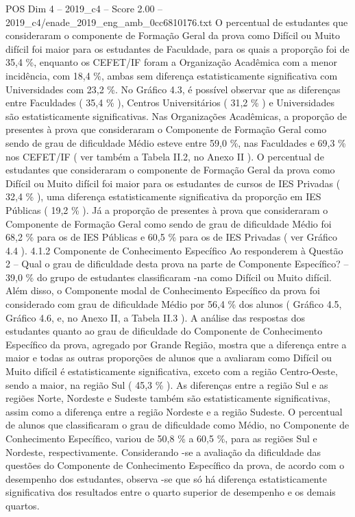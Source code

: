 \begin{textsample}{POS Dim 4 – 2019\_c4 – Score 2.00 – 2019\_c4/enade\_2019\_eng\_amb\_0cc6810176.txt}
O percentual de estudantes que consideraram o componente de Formação Geral da prova como Difícil ou Muito difícil foi maior para os estudantes de Faculdade, para os quais a proporção foi de 35,4 \%, enquanto os CEFET/IF foram a Organização Acadêmica com a menor incidência, com 18,4 \%, ambas sem diferença estatisticamente significativa com Universidades com 23,2 \%.
No Gráfico 4.3, é possível observar que as diferenças entre Faculdades ( 35,4 \% ), Centros Universitários ( 31,2 \% ) e Universidades são estatisticamente significativas.
Nas Organizações Acadêmicas, a proporção de presentes à prova que consideraram o Componente de Formação Geral como sendo de grau de dificuldade Médio esteve entre 59,0 \%, nas Faculdades e 69,3 \% nos CEFET/IF ( ver também a Tabela II.2, no Anexo II ).
O percentual de estudantes que consideraram o componente de Formação Geral da prova como Difícil ou Muito difícil foi maior para os estudantes de cursos de IES Privadas ( 32,4 \% ), uma diferença estatisticamente significativa da proporção em IES Públicas ( 19,2 \% ).
Já a proporção de presentes à prova que consideraram o Componente de Formação Geral como sendo de grau de dificuldade Médio foi 68,2 \% para os de IES Públicas e 60,5 \% para os de IES Privadas ( ver Gráfico 4.4 ). 4.1.2 Componente de Conhecimento Específico Ao responderem à Questão 2 – Qual o grau de dificuldade desta prova na parte de Componente Específico? – 39,0 \% do grupo de estudantes classificaram -na como Difícil ou Muito difícil.
Além disso, o Componente modal de Conhecimento Específico da prova foi considerado com grau de dificuldade Médio por 56,4 \% dos alunos ( Gráfico 4.5, Gráfico 4.6, e, no Anexo II, a Tabela II.3 ).
A análise das respostas dos estudantes quanto ao grau de dificuldade do Componente de Conhecimento Específico da prova, agregado por Grande Região, mostra que a diferença entre a maior e todas as outras proporções de alunos que a avaliaram como Difícil ou Muito difícil é estatisticamente significativa, exceto com a região Centro-Oeste, sendo a maior, na região Sul ( 45,3 \% ).
As diferenças entre a região Sul e as regiões Norte, Nordeste e Sudeste também são estatisticamente significativas, assim como a diferença entre a região Nordeste e a região Sudeste.
O percentual de alunos que classificaram o grau de dificuldade como Médio, no Componente de Conhecimento Específico, variou de 50,8 \% a 60,5 \%, para as regiões Sul e Nordeste, respectivamente.
Considerando -se a avaliação da dificuldade das questões do Componente de Conhecimento Específico da prova, de acordo com o desempenho dos estudantes, observa -se que só há diferença estatisticamente significativa dos resultados entre o quarto superior de desempenho e os demais quartos.

\end{textsample}
